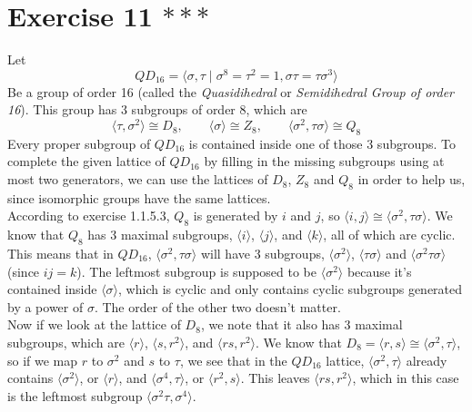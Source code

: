 \documentclass{article}
\begin{document}
    \section*{Exercise 11 $***$}
    Let
    \[ QD_{16} = \langle \sigma, \tau \mid \sigma^8 = \tau^2 = 1,
    \sigma\tau = \tau\sigma^3 \rangle \] 
    Be a group of order 16
    (called the \textit{Quasidihedral} or \textit{Semidihedral
    Group of order 16}).
    This group has 3 subgroups of order 8,
    which are
    \[ \langle \tau, \sigma^2 \rangle \cong D_8, \qquad
    \langle \sigma \rangle \cong Z_8, \qquad
    \langle \sigma^2, \tau\sigma \rangle \cong Q_8 \]
    Every proper subgroup of $QD_{16}$ is contained inside one of those
    3 subgroups.
    To complete the given lattice of $QD_{16}$ by filling in the missing
    subgroups using at most two generators,
    we can use the lattices of $D_8$, $Z_8$ and $Q_8$
    in order to help us,
    since isomorphic groups have the same lattices. \\
    According to exercise 1.1.5.3,
    $Q_8$ is generated by $i$ and $j$,
    so $\langle i, j \rangle \cong \langle \sigma^2, \tau\sigma \rangle$.
    We know that $Q_8$ has 3 maximal subgroups,
    $\langle i \rangle$, $\langle j \rangle$, and $\langle k \rangle$,
    all of which are cyclic.
    This means that in $QD_{16}$,
    $\langle \sigma^2, \tau\sigma \rangle$
    will have 3 subgroups,
    $\langle \sigma^2 \rangle$,
    $\langle \tau\sigma \rangle$
    and 
    $\langle \sigma^2\tau\sigma \rangle$
    (since $ij = k$).
    The leftmost subgroup is supposed to be $\langle \sigma^2 \rangle$
    because it's contained inside $\langle \sigma \rangle$,
    which is cyclic and only contains cyclic subgroups generated
    by a power of $\sigma$.
    The order of the other two doesn't matter. \\
    Now if we look at the lattice of $D_8$,
    we note that it also has 3 maximal subgroups,
    which are $\langle r \rangle$,
    $\langle s, r^2 \rangle$, 
    and $\langle rs, r^2 \rangle$.
    We know that
    $D_8 = \langle r, s \rangle \cong \langle \sigma^2, \tau \rangle$,
    so if we map $r$ to $\sigma^2$ and $s$ to $\tau$,
    we see that in the $QD_{16}$ lattice,
    $\langle \sigma^2, \tau \rangle$
    already contains $\langle \sigma^2\rangle$, or $\langle r \rangle$,
    and $\langle \sigma^4, \tau \rangle$, or $\langle r^2, s \rangle$.
    This leaves $\langle rs, r^2  \rangle$,
    which in this case is the leftmost subgroup
    $\langle \sigma^2\tau, \sigma^4 \rangle$. \\
\end{document}
